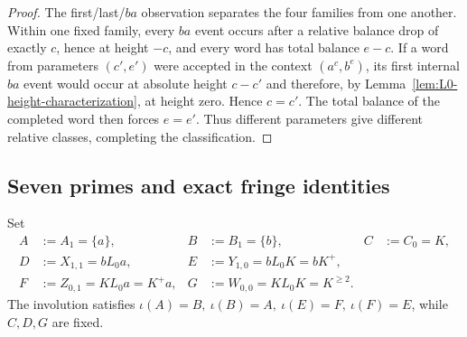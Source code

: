 \documentclass[11pt,a4paper]{article}
\begin{document}
\begin{proof}
The first/last/$ba$ observation separates the four families from one
another.  Within one fixed family, every $ba$ event occurs after a
relative balance drop of exactly $c$, hence at height $-c$, and every
word has total balance $e-c$.  If a word from parameters $(c',e')$
were accepted in the context $(a^c,b^e)$, its first internal $ba$
event would occur at absolute height $c-c'$ and therefore, by Lemma~\ref{lem:L0-height-characterization}, at height zero.  Hence $c=c'$.  The total
balance of the completed word then forces $e=e'$.  Thus different
parameters give different relative classes, completing the
classification.
\end{proof}

\subsection{Seven primes and exact fringe identities}

Set
\[
\begin{aligned}
A&:=A_1=\{a\}, & B&:=B_1=\{b\}, & C&:=C_0=K,\\
D&:=X_{1,1}=bL_0a, & E&:=Y_{1,0}=bL_0K=bK^+,\\
F&:=Z_{0,1}=KL_0a=K^+a, & G&:=W_{0,0}=KL_0K=K^{\ge2}.
\end{aligned}
\]
The involution satisfies
\(\iota(A)=B,\ \iota(B)=A,\ \iota(E)=F,\ \iota(F)=E\), while
$C,D,G$ are fixed.
\end{document}
